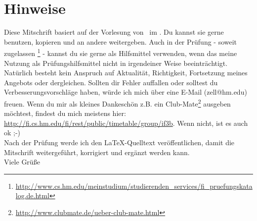 \renewcommand{\ldate}{2015-10-01}

\section{Hinweise}
Diese Mitschrift basiert auf der Vorlesung \textquote{\pTitle} von \pProfessor \ im \pSemester. Du kannst sie gerne benutzen, kopieren und an andere weitergeben. Auch in der Prüfung - soweit zugelassen \footnote{\url{http://www.cs.hm.edu/meinstudium/studierenden_services/fi_pruefungskatalog.de.html}} - kannst du sie gerne als Hilfsmittel verwenden, wenn das meine Nutzung als Prüfungshilfsmittel nicht in irgendeiner Weise beeinträchtigt.\\

Natürlich besteht kein Anspruch auf Aktualität, Richtigkeit, Fortsetzung meines Angebots oder dergleichen. Sollten dir Fehler auffallen oder solltest du Verbesserungsvorschläge haben, würde ich mich über eine E-Mail (zell@hm.edu) freuen. Wenn du mir als kleines Dankeschön z.B. ein Club-Mate\footnote{\url{http://www.clubmate.de/ueber-club-mate.html}} ausgeben möchtest, findest du mich meistens hier: \url{http://fi.cs.hm.edu/fi/rest/public/timetable/group/if3b}. Wenn nicht, ist es auch ok ;-)\\

Nach der Prüfung werde ich den \LaTeX-Quelltext veröffentlichen, damit die Mitschrift weitergeführt, korrigiert und ergänzt werden kann.\\

Viele Grüße\\
\pShortName